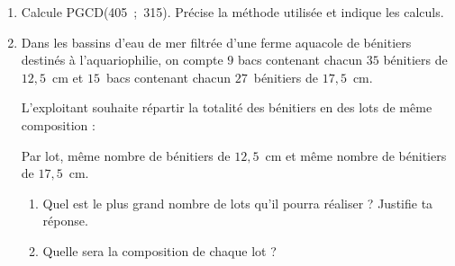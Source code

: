 
\medskip

\begin{enumerate}
\item Calcule PGCD(405~;~315). Précise la méthode utilisée et indique les calculs. 
\item Dans les bassins d'eau de mer filtrée d'une ferme aquacole de bénitiers destinés à l'aquariophilie, on compte $9$ bacs contenant chacun $35$ bénitiers de $12,5$~cm et $15$~bacs contenant chacun $27$~bénitiers de $17,5$~cm.
 
L'exploitant souhaite répartir la totalité des bénitiers en des lots de même composition :
 
Par lot, même nombre de bénitiers de $12,5$~cm et même nombre de bénitiers de $17,5$~cm. 
	\begin{enumerate}
		\item Quel est le plus grand nombre de lots qu'il pourra réaliser ? Justifie ta réponse. 
		\item Quelle sera la composition de chaque lot ? 
	\end{enumerate}
\end{enumerate}

\bigskip

